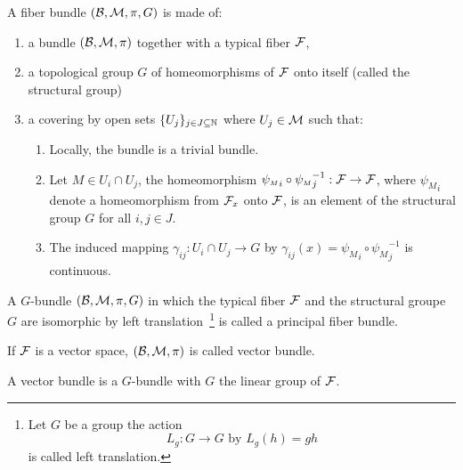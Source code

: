 \begin{definition}[G-bundle]
A fiber bundle $(\mathcal{B},\mathcal{M},\pi, G)$ is  made of:
\begin{enumerate}
	\item a bundle $(\mathcal{B},\mathcal{M},\pi)$
together with a typical fiber $\mathcal{F}$, 

\vspace{3pt}
	\item a topological group $G$ of homeomorphisms of $\mathcal{F}$ onto itself (called the structural group)
	
	\vspace{3pt}
	\item a covering by open sets $\{U_j\}_{j\in J \subseteq \mathbb{N}}$ where  $U_j \in\mathcal{M}$  such that:

\vspace{3pt}
\begin{enumerate}
\item Locally, the bundle is a trivial bundle.

\vspace{3pt}
\item Let ${\scriptstyle M}\in U_i\cap U_j$, the homeomorphism $ {\psi_{\scriptscriptstyle M}}_i\circ {\psi_{\scriptscriptstyle M}}_{j}^{-1}: \mathcal{F} \to\mathcal{F}$, where
${\psi_{\scriptscriptstyle M}}_{i}$ denote a homeomorphism from $\mathcal{F}_x$ onto $\mathcal{F}$, is an element of the structural group $G$ for all $i,j \in J$.

\vspace{3pt}
\item The induced mapping $\gamma_{ij}: U_i\cap U_j \to G$ by $\gamma_{ij}(x)=  {\psi_{\scriptscriptstyle M}}_i\circ {\psi_{\scriptscriptstyle M}}_{j}^{-1}$ is continuous.
\end{enumerate}
\end{enumerate}
\end{definition}

\begin{definition}
A $G$-bundle $(\mathcal{B},\mathcal{M},\pi, G)$ in which the typical fiber $\mathcal{F}$ and the structural groupe $G$ are isomorphic by left translation~\footnote{Let $G$ be a group the action \[L_{g}:G\to G \text{ by } L_{g}(h)=gh\] is called left translation.} is called a principal fiber bundle.
\end{definition}


\begin{definition}	
	\noindent If $\mathcal{F}$ is a vector space, $(\mathcal{B},\mathcal{M},\pi)$ is  called vector bundle.	
\end{definition}
A vector bundle is a $G$-bundle with $G$ the linear group of $\mathcal{F}$.

